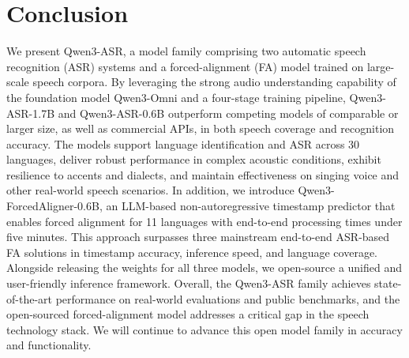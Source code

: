 \section{Conclusion}
\label{sec:conclusion}


We present Qwen3-ASR, a model family comprising two automatic speech recognition (ASR) systems and a forced-alignment (FA) model trained on large-scale speech corpora. By leveraging the strong audio understanding capability of the foundation model Qwen3-Omni and a four-stage training pipeline, Qwen3-ASR-1.7B and Qwen3-ASR-0.6B outperform competing models of comparable or larger size, as well as commercial APIs, in both speech coverage and recognition accuracy. The models support language identification and ASR across 30 languages, deliver robust performance in complex acoustic conditions, exhibit resilience to accents and dialects, and maintain effectiveness on singing voice and other real-world speech scenarios. In addition, we introduce Qwen3-ForcedAligner-0.6B, an LLM-based non-autoregressive timestamp predictor that enables forced alignment for 11 languages with end-to-end processing times under five minutes. This approach surpasses three mainstream end-to-end ASR-based FA solutions in timestamp accuracy, inference speed, and language coverage. Alongside releasing the weights for all three models, we open-source a unified and user-friendly inference framework. Overall, the Qwen3-ASR family achieves state-of-the-art performance on real-world evaluations and public benchmarks, and the open-sourced forced-alignment model addresses a critical gap in the speech technology stack. We will continue to advance this open model family in accuracy and functionality.


